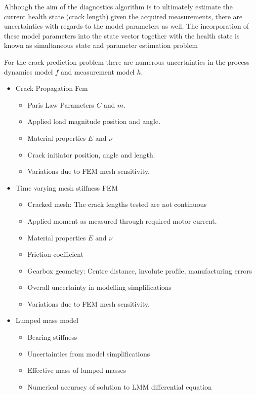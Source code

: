 Although the aim of the diagnostics algorithm is to ultimately estimate the current health state (crack length) given the acquired measurements, there are uncertainties with regards to the model parameters as well. The incorporation of these model parameters into the state vector together with the health state is known as simultaneous state and parameter estimation problem\cite{Fang2018}

For the crack prediction problem there are numerous uncertainties in the process dynamics model $f$ and measurement model $h$.

\begin{itemize}
	\item Crack Propagation Fem
	\begin{itemize}
		\item Paris Law Parameters $C$ and $m$.
		\item Applied load magnitude position and angle. 
		\item Material properties $E$ and $\nu$
		\item Crack initiator position, angle and length.
		\item Variations due to FEM mesh sensitivity. 
	\end{itemize}
	\item Time varying mesh stiffness FEM
	\begin{itemize}
		\item Cracked mesh: The crack lengths tested are not continuous
		\item Applied moment as measured through required motor current.
		\item Material properties $E$ and $\nu$
		\item Friction coefficient
		\item Gearbox geometry: Centre distance, involute profile, manufacturing errors
		\item Overall uncertainty in modelling simplifications
		\item Variations due to FEM mesh sensitivity. 
	\end{itemize}
	\item Lumped mass model 
	\begin{itemize}
		\item Bearing stiffness
		\item Uncertainties from model simplifications
		\item Effective mass of lumped masses
		\item Numerical accuracy of solution to LMM differential equation

\end{itemize}
\end{itemize}
